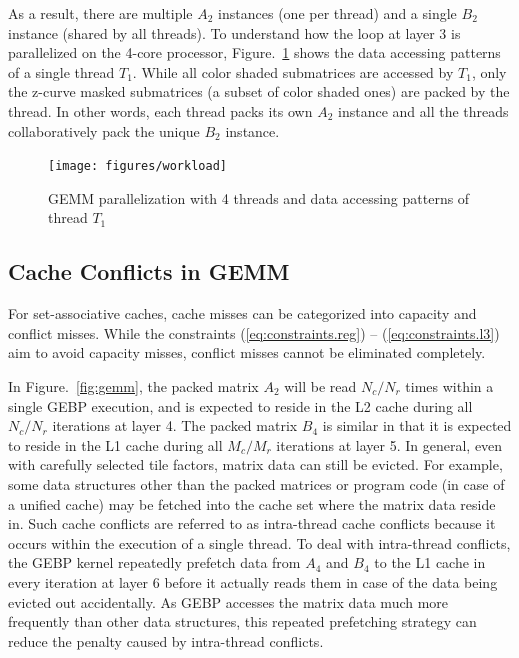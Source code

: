 As a result, there are multiple $A_2$ instances (one per thread)
and a single $B_2$ instance (shared by all threads).
To understand how the loop at layer 3 is parallelized on the 4-core processor, 
Figure.~\ref{fig:workload} shows the data accessing patterns of a single thread $T_1$.
While all color shaded submatrices are accessed by $T_1$,
only the z-curve masked submatrices (a subset of color shaded ones)
are packed by the thread.
In other words, each thread packs its own $A_2$ instance and  all the threads collaboratively pack the unique $B_2$ instance.

\begin{figure}[t]
  \centering
  \texttt{[image: figures/workload]}
  \caption{GEMM parallelization with 4 threads and data accessing patterns of thread $T_1$}
  \label{fig:workload}
\end{figure}

\subsection{Cache Conflicts in GEMM}\label{subsec:cache-conflicts}

For set-associative caches, cache misses can be categorized
into capacity and conflict misses.
While the constraints (\ref{eq:constraints.reg}) -- (\ref{eq:constraints.l3})
aim to avoid capacity misses,
conflict misses cannot be eliminated completely.

In Figure.~\ref{fig:gemm}, the packed matrix $A_2$
will be read $N_c/N_r$ times within a single GEBP execution,
and is expected to reside in the 
L2 cache during all $N_c/N_r$ iterations at layer 4.
The packed matrix $B_4$ is similar in that it is expected to
reside in the L1 cache during all $M_c/M_r$ iterations at layer 5.
In general, even with carefully selected tile factors,
matrix data can still be evicted.
For example, some data structures other than the packed matrices
or program code (in case of a unified cache) may be fetched into the
cache set where the matrix data reside in.
Such cache conflicts are referred to as
intra-thread cache conflicts
because it occurs within the execution of a single thread.
To deal with intra-thread conflicts,
the GEBP kernel repeatedly prefetch data from $A_4$ and $B_4$ to the L1 cache
in every iteration at layer 6 before it actually reads them in case of
the data being evicted out accidentally.
As GEBP accesses the matrix data much more frequently than other
data structures, this repeated prefetching strategy
can reduce the penalty caused by intra-thread conflicts.

